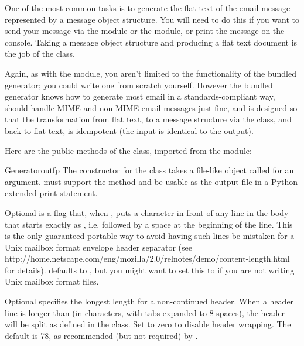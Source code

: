 
One of the most common tasks is to generate the flat text of the email
message represented by a message object structure.  You will need to do
this if you want to send your message via the 
module or the  module, or print the message on the
console.  Taking a message object structure and producing a flat text
document is the job of the  class.

Again, as with the  module, you aren't limited
to the functionality of the bundled generator; you could write one
from scratch yourself.  However the bundled generator knows how to
generate most email in a standards-compliant way, should handle MIME
and non-MIME email messages just fine, and is designed so that the
transformation from flat text, to a message structure via the
 class, and back to flat text, is idempotent (the input
is identical to the output).

Here are the public methods of the  class, imported from the
 module:

\begin{classdesc}{Generator}{outfp}
The constructor for the  class takes a file-like
object called  for an argument.   must support
the  method and be usable as the output file in a
Python extended print statement.

Optional  is a flag that, when , puts a
\samp{>} character in front of any line in the body that starts exactly as
, i.e.  followed by a space at the beginning of the
line.  This is the only guaranteed portable way to avoid having such
lines be mistaken for a Unix mailbox format envelope header separator (see
{http://home.netscape.com/eng/mozilla/2.0/relnotes/demo/content-length.html}
for details).   defaults to , but you
might want to set this to  if you are not writing Unix
mailbox format files.

Optional  specifies the longest length for a
non-continued header.  When a header line is longer than
 (in characters, with tabs expanded to 8 spaces),
the header will be split as defined in the 
class.  Set to zero to disable header wrapping.  The default is 78, as
recommended (but not required) by .
\end{classdesc}

